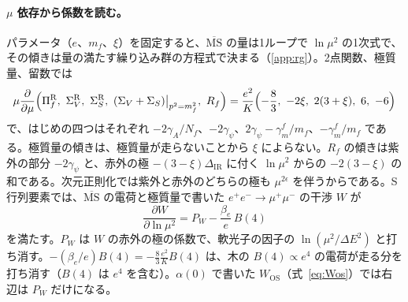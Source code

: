 \documentclass[a4paper,10pt]{ltjsarticle}
\newcommand{\MSbar}{\overline{\mathrm{MS}}}
\newcommand{\DIR}{\Delta_{\mathrm{IR}}}
\begin{document}
\paragraph{$\mu$ 依存から係数を読む。}パラメータ（$e$、$m_f$、$\xi$）を固定すると、$\MSbar$ の量は1ループで $\ln\mu^2$ の1次式で、その傾きは量の満たす繰り込み群の方程式で決まる（\ref{app:rg}）。2点関数、極質量、留数では
\begin{equation}
\mu\frac{\partial}{\partial\mu}\Bigl(\Pi_f^{\mathrm R},\ \Sigma_V^{\mathrm R},\ \Sigma_S^{\mathrm R},\ (\Sigma_V+\Sigma_S)\big|_{p^2=m_f^2},\ R_f\Bigr)
=\frac{e^2}{K}\Bigl(-\frac83,\ -2\xi,\ 2(3+\xi),\ 6,\ -6\Bigr)
\label{eq:rgslope}
\end{equation}
で、はじめの四つはそれぞれ $-2\gamma_A/N_f$、$-2\gamma_\psi$、$2\gamma_\psi-\gamma_m^f/m_f$、$-\gamma_m^f/m_f$ である。極質量の傾きは、極質量が走らないことから $\xi$ によらない。$R_f$ の傾きは紫外の部分 $-2\gamma_\psi$ と、赤外の極 $-(3-\xi)\DIR$ に付く $\ln\mu^2$ からの $-2(3-\xi)$ の和である。次元正則化では紫外と赤外のどちらの極も $\mu^{2\epsilon}$ を伴うからである。S 行列要素では、$\MSbar$ の電荷と極質量で書いた $e^+e^-\to\mu^+\mu^-$ の干渉 $W$ が
\begin{equation}
\frac{\partial W}{\partial\ln\mu^2}=P_W-\frac{\beta_e}{e}\,B(4)
\label{eq:rgW}
\end{equation}
を満たす。$P_W$ は $W$ の赤外の極の係数で、軟光子の因子の $\ln(\mu^2/\Delta E^2)$ と打ち消す。$-(\beta_e/e)B(4)=-\frac83\frac{e^2}{K}B(4)$ は、木の $B(4)\propto e^4$ の電荷が走る分を打ち消す（$B(4)$ は $e^4$ を含む）。$\alpha(0)$ で書いた $W_{\mathrm{OS}}$（式~\eqref{eq:Wos}）では右辺は $P_W$ だけになる。
\end{document}
